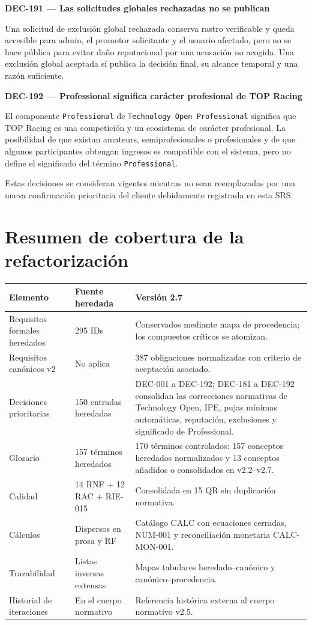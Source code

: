 \documentclass[10pt,letterpaper]{article}
\begin{document}
\noindent\textbf{DEC-191 --- Las solicitudes globales rechazadas no se publican}\par
Una solicitud de exclusión global rechazada conserva rastro verificable y queda accesible para admin, el promotor solicitante y el usuario afectado, pero no se hace pública para evitar daño reputacional por una acusación no acogida. Una exclusión global aceptada sí publica la decisión final, su alcance temporal y una razón suficiente.\par\vspace{0.45em}
\noindent\textbf{DEC-192 --- Professional significa carácter profesional de TOP Racing}\par
El componente \texttt{Professional} de \texttt{Technology Open Professional} significa que TOP Racing es una competición y un ecosistema de carácter profesional. La posibilidad de que existan amateurs, semiprofesionales o profesionales y de que algunos participantes obtengan ingresos es compatible con el sistema, pero no define el significado del término \texttt{Professional}.\par\vspace{0.45em}
Estas decisiones se consideran vigentes mientras no sean reemplazadas por una nueva confirmación prioritaria del cliente debidamente registrada en esta SRS.\par \label{sec:01_05_vision_general}\par\vspace{0.45em}
\section{Resumen de cobertura de la refactorización}
\begin{longtable}{P{7.2cm}P{3.0cm}P{3.0cm}}
\toprule
\textbf{Elemento} & \textbf{Fuente heredada} & \textbf{Versión 2.7}\\
\midrule
Requisitos formales heredados & 295 IDs & Conservados mediante mapa de procedencia; los compuestos críticos se atomizan.\\
Requisitos canónicos v2 & No aplica & 387 obligaciones normalizadas con criterio de aceptación asociado.\\
Decisiones prioritarias & 150 entradas heredadas & DEC-001 a DEC-192; DEC-181 a DEC-192 consolidan las correcciones normativas de Technology Open, IPE, pujas mínimas automáticas, reputación, exclusiones y significado de Professional.\\
Glosario & 157 términos heredados & 170 términos controlados: 157 conceptos heredados normalizados y 13 conceptos añadidos o consolidados en v2.2--v2.7.\\
Calidad & 14 RNF + 12 RAC + RIE-015 & Consolidada en 15 QR sin duplicación normativa.\\
Cálculos & Dispersos en prosa y RF & Catálogo CALC con ecuaciones cerradas, NUM-001 y reconciliación monetaria CALC-MON-001.\\
Trazabilidad & Listas inversas extensas & Mapas tabulares heredado--canónico y canónico--procedencia.\\
Historial de iteraciones & En el cuerpo normativo & Referencia histórica externa al cuerpo normativo v2.5.\\
\bottomrule
\end{longtable}
\end{document}
